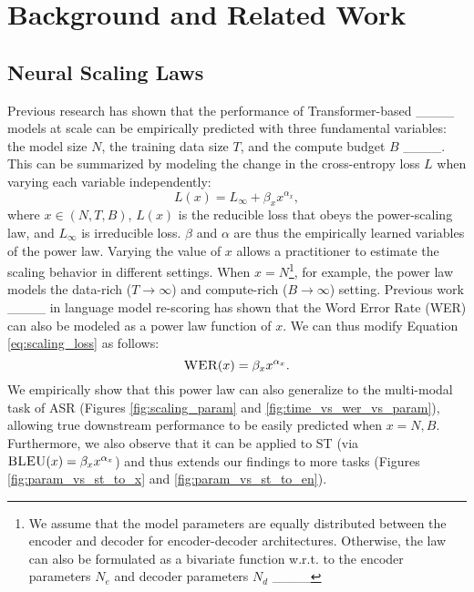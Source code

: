 \section{Background and Related Work}
\subsection{Neural Scaling Laws}
\vspace{-0.2cm}
Previous research has shown that the performance of Transformer-based ____ models at scale can be empirically predicted with three fundamental variables: the model size $N$, the training data size $T$, and the compute budget $B$ ____. This can be summarized by modeling the change in the cross-entropy loss $L$ when varying each variable independently:
\begin{equation}
    L(x) = L_{\infty} + {\beta_x}{x}^{\alpha_x},
    \label{eq:scaling_loss}
\end{equation}
where $x \in (N, T, B)$, $L(x)$ is the reducible loss that obeys the power-scaling law, and $L_{\infty}$ is irreducible loss. $\beta$ and $\alpha$ are thus the empirically learned variables of the power law. Varying the value of $x$ allows a practitioner to estimate the scaling behavior in different settings. When $x=N$\footnote{We assume that the model parameters are equally distributed between the encoder and decoder for encoder-decoder architectures. Otherwise, the law can also be formulated as a bivariate function w.r.t. to the encoder parameters $N_e$ and decoder parameters $N_d$  ____}, for example, the power law models the data-rich ($T \rightarrow \infty$) and compute-rich ($B \rightarrow \infty$) setting. Previous work ____ in language model re-scoring has shown that the Word Error Rate (WER) can also be modeled as a power law function of $x$. We can thus modify Equation \ref{eq:scaling_loss} as follows:
\begin{equation}
    \textsc{WER}(x) = {\beta_x}{x}^{\alpha_x}.
    \label{eq:scaling_wer}
\end{equation}
We empirically show that this power law can also generalize to the multi-modal task of ASR (Figures \ref{fig:scaling_param} and \ref{fig:time_vs_wer_vs_param}), allowing true downstream performance to be easily predicted when $x=N,B$. Furthermore, we also observe that it can be applied to ST (via $\textsc{BLEU}(x) = {\beta_x}{x}^{\alpha_x}$) and thus extends our findings to more tasks (Figures \ref{fig:param_vs_st_to_x} and  \ref{fig:param_vs_st_to_en}). 

